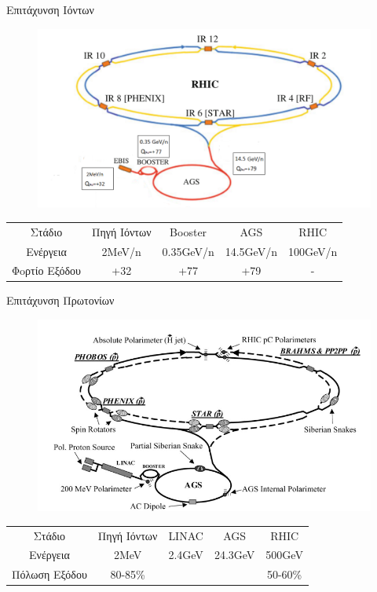 \documentclass[18pt,notheorems,hyperref={pdfauthor=whatever}]{beamer}
\begin{document}
\begin{frame}{Επιτάχυνση Ιόντων}
    \begin{figure}
        \centering
        \includegraphics[scale=0.6]{images/RHIC_full_ions.png}
    \end{figure}

    \begin{table}[h!]
        \centering
        \begin{tabular}{c|cccc}
      Στάδιο   & Πηγή Ιόντων   &  Booster    & AGS       & RHIC\\
      Ενέργεια &  2MeV/n       & 0.35GeV/n   & 14.5GeV/n & 100GeV/n\\
      Φoρτίο Εξόδου  & +32           & +77         &  +79      & -
        \end{tabular}
    \end{table}
\end{frame}

\begin{frame}{Επιτάχυνση Πρωτονίων}
    \begin{figure}
        \centering
        \includegraphics[scale=0.7]{images/protons_path.png}
    \end{figure}

\begin{table}[]
        \centering
        \begin{tabular}{c|cccc}
      Στάδιο         & Πηγή Ιόντων   &  LINAC    & AGS       & RHIC\\
      Ενέργεια       &  2MeV       &  2.4GeV   & 24.3GeV & 500GeV\\
      Πόλωση Εξόδου  & 80-85\%       &         &       & 50-60\%
        \end{tabular}
    \end{table}
\end{frame}
    
\end{document}
